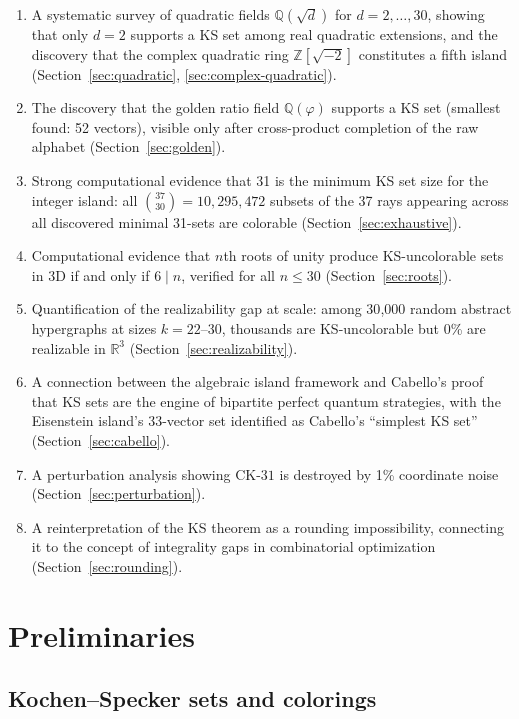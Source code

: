 \documentclass[12pt,a4paper]{article}
\newcommand{\R}{\mathbb{R}}
\newcommand{\Z}{\mathbb{Z}}
\newcommand{\Q}{\mathbb{Q}}
\newcommand{\CK}{\mathrm{CK}\text{-}31}
\begin{document}
\begin{enumerate}[label=(\roman*)]
    \item A systematic survey of quadratic fields $\Q(\sqrt{d})$ for $d = 2, \ldots, 30$, showing that only $d = 2$ supports a KS set among real quadratic extensions, and the discovery that the complex quadratic ring $\Z[\sqrt{-2}]$ constitutes a fifth island (Section~\ref{sec:quadratic}, \ref{sec:complex-quadratic}).
    \item The discovery that the golden ratio field $\Q(\varphi)$ supports a KS set (smallest found: 52 vectors), visible only after cross-product completion of the raw alphabet (Section~\ref{sec:golden}).
    \item Strong computational evidence that 31 is the minimum KS set size for the integer island: all $\binom{37}{30} = 10{,}295{,}472$ subsets of the 37 rays appearing across all discovered minimal 31-sets are colorable (Section~\ref{sec:exhaustive}).
    \item Computational evidence that $n$th roots of unity produce KS-uncolorable sets in 3D if and only if $6 \mid n$, verified for all $n \leq 30$ (Section~\ref{sec:roots}).
    \item Quantification of the realizability gap at scale: among 30{,}000 random abstract hypergraphs at sizes $k = 22$--$30$, thousands are KS-uncolorable but 0\% are realizable in $\R^3$ (Section~\ref{sec:realizability}).
    \item A connection between the algebraic island framework and Cabello's proof that KS sets are the engine of bipartite perfect quantum strategies, with the Eisenstein island's 33-vector set identified as Cabello's ``simplest KS set'' (Section~\ref{sec:cabello}).
    \item A perturbation analysis showing $\CK$ is destroyed by 1\% coordinate noise (Section~\ref{sec:perturbation}).
    \item A reinterpretation of the KS theorem as a rounding impossibility, connecting it to the concept of integrality gaps in combinatorial optimization (Section~\ref{sec:rounding}).
\end{enumerate}

\section{Preliminaries}\label{sec:prelim}

\subsection{Kochen--Specker sets and colorings}
\end{document}
